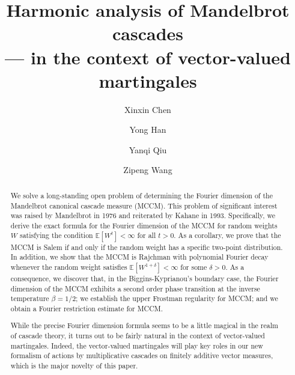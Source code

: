 \documentclass[12pt]{amsart}
\theoremstyle{definition}
\theoremstyle{remark}
\newcommand{\E}{\mathbb{E}}
\numberwithin{equation}{section}
\begin{document}
\title[Harmonic analysis of Mandelbrot cascades]{Harmonic analysis of Mandelbrot cascades\\ {\MakeLowercase{--- in the context of vector-valued martingales}}}



\author
{Xinxin Chen}
\address
{Xinxin CHEN: School of Mathematical Sciences
Beijing Normal (Teachers) University
Beijing 100875, China}

\author%
{Yong Han}
\address%
{Yong HAN: School of Mathematical Sciences, Shenzhen University, Shenzhen 518060, Guangdong, China}


\author%
{Yanqi Qiu}
\address%
{Yanqi Qiu: School of Fundamental Physics and Mathematical Sciences, HIAS, University of Chinese Academy of Sciences, Hangzhou 310024, China}


\author{Zipeng Wang}
\address{Zipeng WANG: College of Mathematics and Statistics, Chongqing University, Chongqing
401331, China}


\begin{abstract}

We solve a long-standing open problem of determining the Fourier dimension of the Mandelbrot canonical cascade measure (MCCM). This problem of significant interest was raised by Mandelbrot in 1976 and reiterated by Kahane in 1993. Specifically,
we derive the exact formula for the Fourier dimension of the MCCM for  random weights $W$ satisfying the condition $\E[W^t]<\infty$ for all $t>0$. As a corollary, we prove that  the MCCM is Salem if and only if the random weight has a specific two-point distribution.  In addition, we show that  the  MCCM is Rajchman with polynomial Fourier decay whenever the random weight satisfies $\E[W^{1+\delta}]<\infty$ for some $\delta>0$.  As a consequence, we discover that,   in the Biggins-Kyprianou's boundary case,  the Fourier dimension of the MCCM exhibits a second order phase transition at the inverse temperature $\beta = 1/2$; we establish the upper Frostman regularity for MCCM;  and we obtain a Fourier restriction estimate for MCCM. 

 While the precise Fourier dimension formula seems to be a little magical in the realm of cascade theory, it turns out to be fairly natural in the context of vector-valued martingales.     Indeed, the vector-valued martingales will play key roles in our new formalism of  actions by multiplicative cascades on finitely additive vector measures, which is the major novelty of this paper. 
\end{abstract}
\end{document}
